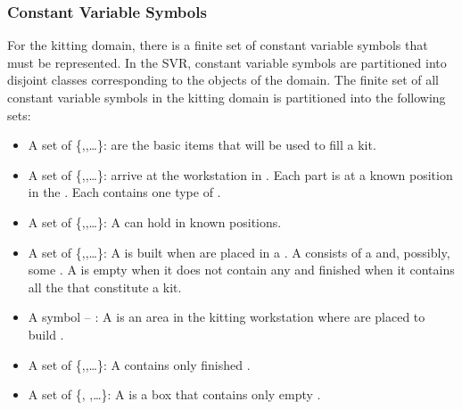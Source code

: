 \subsubsection{Constant Variable Symbols}
For the kitting domain, there is a finite set of constant variable symbols that must be represented. In the SVR, constant variable symbols are partitioned into disjoint classes corresponding to the objects of the domain. The finite set of all constant variable symbols in the kitting domain is partitioned into the following sets:
\begin{itemize}
\item A set of  \{,,\ldots\}:  are the basic items that will be used to fill a kit.

\item A set of  \{,,\ldots\}:  arrive at the workstation in . Each part is at a known position in the . Each  contains one type of .

\item A set of  \{,,\ldots\}:  A  can hold  in known positions.

\item A set of  \{,,\ldots\}: A  is built when  are placed in a . A  consists of a  and, possibly, some . A  is empty when it does not contain any  and finished when it contains all the  that constitute a kit.

\item A symbol  -- : A  is an area in the kitting workstation where  are placed to build .

\item A set of  \{,,\ldots\}: A  contains only finished .

\item A set of  \{, ,\ldots\}: A  is a box that contains only empty .


\end{itemize}
